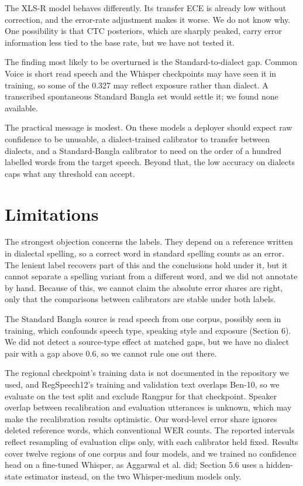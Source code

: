 \documentclass[10pt]{article}
\begin{document}
The XLS-R model behaves differently. Its transfer ECE is already low without correction, and the error-rate adjustment makes it worse. We do not know why. One possibility is that CTC posteriors, which are sharply peaked, carry error information less tied to the base rate, but we have not tested it.


The finding most likely to be overturned is the Standard-to-dialect gap. Common Voice is short read speech and the Whisper checkpoints may have seen it in training, so some of the 0.327 may reflect exposure rather than dialect. A transcribed spontaneous Standard Bangla set would settle it; we found none available.


The practical message is modest. On these models a deployer should expect raw confidence to be unusable, a dialect-trained calibrator to transfer between dialects, and a Standard-Bangla calibrator to need on the order of a hundred labelled words from the target speech. Beyond that, the low accuracy on dialects caps what any threshold can accept.


\section{Limitations}

The strongest objection concerns the labels. They depend on a reference written in dialectal spelling, so a correct word in standard spelling counts as an error. The lenient label recovers part of this and the conclusions hold under it, but it cannot separate a spelling variant from a different word, and we did not annotate by hand. Because of this, we cannot claim the absolute error shares are right, only that the comparisons between calibrators are stable under both labels.


The Standard Bangla source is read speech from one corpus, possibly seen in training, which confounds speech type, speaking style and exposure (Section 6). We did not detect a source-type effect at matched gaps, but we have no dialect pair with a gap above 0.6, so we cannot rule one out there.


The regional checkpoint's training data is not documented in the repository we used, and RegSpeech12's training and validation text overlaps Ben-10, so we evaluate on the test split and exclude Rangpur for that checkpoint. Speaker overlap between recalibration and evaluation utterances is unknown, which may make the recalibration results optimistic. Our word-level error share ignores deleted reference words, which conventional WER counts. The reported intervals reflect resampling of evaluation clips only, with each calibrator held fixed. Results cover twelve regions of one corpus and four models, and we trained no confidence head on a fine-tuned Whisper, as Aggarwal et al. did; Section 5.6 uses a hidden-state estimator instead, on the two Whisper-medium models only.
\end{document}
